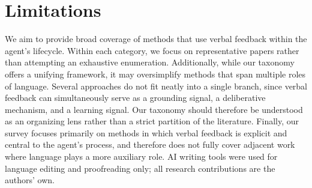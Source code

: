 \section*{Limitations}
We aim to provide broad coverage of methods that use verbal feedback within the agent's lifecycle. Within each category, we focus on representative papers rather than attempting an exhaustive enumeration. Additionally, while our taxonomy offers a unifying framework, it may oversimplify methods that span multiple roles of language. Several approaches do not fit neatly into a single branch, since verbal feedback can simultaneously serve as a grounding signal, a deliberative mechanism, and a learning signal. Our taxonomy should therefore be understood as an organizing lens rather than a strict partition of the literature. Finally, our survey focuses primarily on methods in which verbal feedback is explicit and central to the agent's process, and therefore does not fully cover adjacent work where language plays a more auxiliary role.  AI writing tools were used for language editing and proofreading only; all research contributions are the authors' own.
